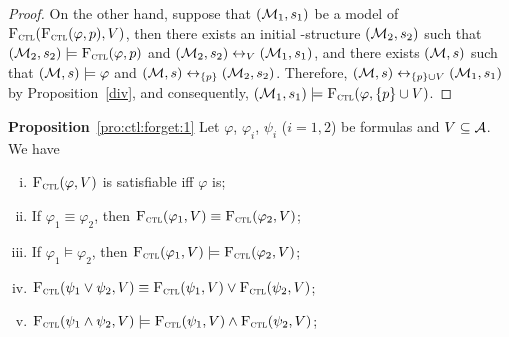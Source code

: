 \documentclass{article}
\begin{document}
\begin{proof}
On the other hand, suppose that $({\cal M}_1, s_1)$ be a model of ${\textsc{F}_{\textsc{ctl}}}({\textsc{F}_{\textsc{ctl}}}(\varphi, p), V)$, then there exists an initial \MPK-structure $({\cal M}_2, s_2)$ such that $({\cal M}_2, s_2) \models {\textsc{F}_{\textsc{ctl}}}(\varphi, p)$ and $({\cal M}_2, s_2) \leftrightarrow_V ({\cal M}_1, s_1)$, and there exists $({\cal M}, s)$ such that $({\cal M}, s) \models \varphi$ and $({\cal M}, s) \leftrightarrow_{\{p\}} ({\cal M}_2, s_2)$. Therefore, $({\cal M}, s) \leftrightarrow_{\{p\} \cup V} ({\cal M}_1, s_1)$ by Proposition~\ref{div}, and consequently, $({\cal M}_1, s_1) \models {\textsc{F}_{\textsc{ctl}}}(\varphi, \{p\} \cup V)$.
\end{proof}



\textbf{Proposition}~\ref{pro:ctl:forget:1}
Let $\varphi$, $\varphi_i$, $\psi_i$ ($i=1,2$) be formulas and $V\subseteq {\cal A}$. We have
\begin{enumerate}[(i)]
  \item ${\textsc{F}_{\textsc{ctl}}}(\varphi, V)$ is satisfiable iff $\varphi$ is;
  \item If $\varphi_1 \equiv \varphi_2$, then ${\textsc{F}_{\textsc{ctl}}}(\varphi_1, V) \equiv {\textsc{F}_{\textsc{ctl}}}(\varphi_2, V)$;
  \item If $\varphi_1 \models \varphi_2$, then ${\textsc{F}_{\textsc{ctl}}}(\varphi_1, V) \models {\textsc{F}_{\textsc{ctl}}}(\varphi_2, V)$;
  \item ${\textsc{F}_{\textsc{ctl}}}(\psi_1 \vee \psi_2, V) \equiv {\textsc{F}_{\textsc{ctl}}}(\psi_1, V) \vee {\textsc{F}_{\textsc{ctl}}}(\psi_2, V)$;
  \item ${\textsc{F}_{\textsc{ctl}}}(\psi_1 \wedge \psi_2, V) \models {\textsc{F}_{\textsc{ctl}}}(\psi_1, V) \wedge {\textsc{F}_{\textsc{ctl}}}(\psi_2, V)$;
\end{enumerate}
\end{document}
